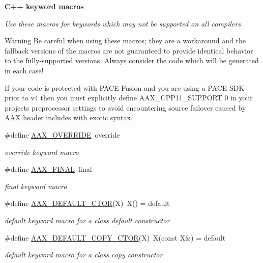 \begin{Indent}\textbf{ C++ keyword macros}\par
{\em Use these macros for keywords which may not be supported on all compilers

\begin{DoxyWarning}{Warning}
Be careful when using these macros; they are a workaround and the fallback versions of the macros are not guaranteed to provide identical behavior to the fully-\/supported versions. Always consider the code which will be generated in each case!

If your code is protected with P\+A\+CE Fusion and you are using a P\+A\+CE S\+DK prior to v4 then you must explicitly define {\ttfamily A\+A\+X\+\_\+\+C\+P\+P11\+\_\+\+S\+U\+P\+P\+O\+RT 0} in your project\textquotesingle{}s preprocessor settings to avoid encountering source failover caused by A\+AX header includes with exotic syntax. 
\end{DoxyWarning}
}\begin{DoxyCompactItemize}
\item 
\#define \mbox{\hyperlink{a00392_ac2f24a5172689ae684344abdcce55463}{A\+A\+X\+\_\+\+O\+V\+E\+R\+R\+I\+DE}}~override
\begin{DoxyCompactList}\small\item\em {\ttfamily override} keyword macro \end{DoxyCompactList}\item 
\#define \mbox{\hyperlink{a00392_aa4da4a09e940c332a2205e34e0677f40}{A\+A\+X\+\_\+\+F\+I\+N\+AL}}~final
\begin{DoxyCompactList}\small\item\em {\ttfamily final} keyword macro \end{DoxyCompactList}\item 
\#define \mbox{\hyperlink{a00392_a5ed9499b8cd7549adf991d46dfbe749b}{A\+A\+X\+\_\+\+D\+E\+F\+A\+U\+L\+T\+\_\+\+C\+T\+OR}}(X)~X() = default
\begin{DoxyCompactList}\small\item\em {\ttfamily default} keyword macro for a class default constructor \end{DoxyCompactList}\item 
\#define \mbox{\hyperlink{a00392_a608ab9e59f8f54c32e68fe0d32e9b991}{A\+A\+X\+\_\+\+D\+E\+F\+A\+U\+L\+T\+\_\+\+C\+O\+P\+Y\+\_\+\+C\+T\+OR}}(X)~X(const X\&) = default
\begin{DoxyCompactList}\small\item\em {\ttfamily default} keyword macro for a class copy constructor \end{DoxyCompactList}\item 

\end{DoxyCompactItemize}
\end{Indent}

